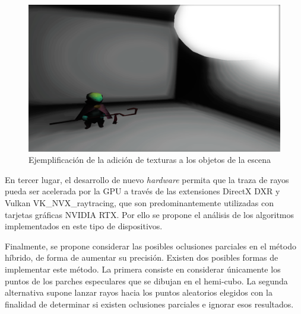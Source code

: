 \begin{figure}[H]
	\centering
	\includegraphics[width=.7\linewidth]{assets/text}
	\caption{Ejemplificación de la adición de texturas a los objetos de la escena}
	\label{img:text}
\end{figure}

En tercer lugar, el desarrollo de nuevo \textit{hardware} permita que la traza de rayos pueda ser acelerada por la GPU a través de las extensiones DirectX DXR y Vulkan VK\_NVX\_raytracing, que son predominantemente utilizadas con tarjetas gráficas NVIDIA RTX. Por ello se propone el análisis de los algoritmos implementados en este tipo de dispositivos.

Finalmente, se propone considerar las posibles oclusiones parciales en el método híbrido, de forma de aumentar su precisión. Existen dos posibles formas de implementar este método. La primera consiste en considerar únicamente los puntos de los parches especulares que se dibujan en el hemi-cubo. La segunda alternativa supone lanzar rayos hacia los puntos aleatorios elegidos con la finalidad de determinar si existen oclusiones parciales e ignorar esos resultados.